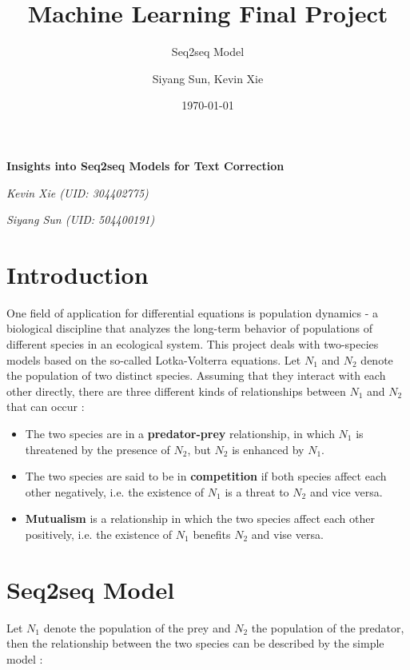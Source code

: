 \documentclass[11pt,a4paper]{scrartcl}
\title{Machine Learning Final Project}
\subtitle{Seq2seq Model}
\author{Siyang Sun, Kevin Xie}
\date{\today}
\theoremstyle{definition}
\begin{document}
\begin{titlepage}
	\centering
	{\Huge\bfseries Insights into Seq2seq Models for Text Correction\par}
	\vspace{7cm}
	{\LARGE\itshape Kevin Xie (UID: 304402775)\par}
	\vspace{.9em}
	{\LARGE\itshape Siyang Sun (UID: 504400191)\par}
	\vspace{.9em}


	\vfill

\end{titlepage}
\tableofcontents

\section{Introduction}
One field of application for differential equations is population dynamics - a biological discipline that analyzes the long-term behavior of populations of different species in an ecological system. This project deals with two-species models based on the so-called Lotka-Volterra equations. Let $N_1$ and $N_2$ denote the population of two distinct species. Assuming that they interact with each other directly, there are three different kinds of relationships between $N_1$ and $N_2$ that can occur \cite{Murray}:

\begin{itemize}
	\item{The two species are in a \textbf{predator-prey} relationship, in which $N_1$ is threatened by the presence of $N_2$, but $N_2$ is enhanced by $N_1$.}
	\item{The two species are said to be in \textbf{competition} if both species affect each other negatively, i.e. the existence of $N_1$ is a threat to $N_2$ and vice versa.}
	\item{\textbf{Mutualism} is a relationship in which the two species affect each other positively, i.e. the existence of $N_1$ benefits $N_2$ and vise versa.}
\end{itemize}

\section{Seq2seq Model}
Let $N_1$ denote the population of the prey and $N_2$ the population of the predator, then the relationship between the two species can be described by the simple model \cite{Haberman}:
\end{document}
